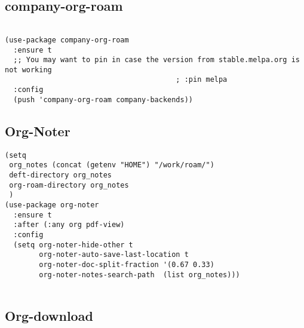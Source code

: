 \documentclass[12pt]{article}
\begin{document}
\subsection{company-org-roam}
\label{sec:org7aee398}
\begin{verbatim}

(use-package company-org-roam
  :ensure t
  ;; You may want to pin in case the version from stable.melpa.org is not working
                                        ; :pin melpa
  :config
  (push 'company-org-roam company-backends))
\end{verbatim}

\subsection{Org-Noter}
\label{sec:org8de70fd}

\begin{verbatim}
(setq
 org_notes (concat (getenv "HOME") "/work/roam/")
 deft-directory org_notes
 org-roam-directory org_notes
 )
(use-package org-noter
  :ensure t
  :after (:any org pdf-view)
  :config
  (setq org-noter-hide-other t
        org-noter-auto-save-last-location t
        org-noter-doc-split-fraction '(0.67 0.33)
        org-noter-notes-search-path  (list org_notes)))


\end{verbatim}


\subsection{Org-download}
\label{sec:orgb8e1627}
\end{document}
